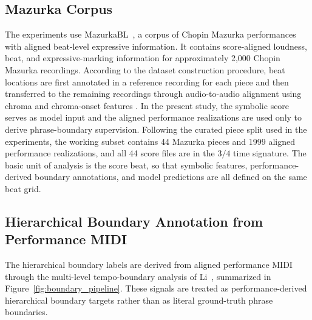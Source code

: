 \documentclass{article}
\begin{document}
\subsection{Mazurka Corpus}\label{subsec:mazurka_corpus}

The experiments use MazurkaBL~\cite{Kosta18MazurkaBL}, a corpus of Chopin Mazurka performances with aligned beat-level expressive information. It contains score-aligned loudness, beat, and expressive-marking information for approximately 2,000 Chopin Mazurka recordings. According to the dataset construction procedure, beat locations are first annotated in a reference recording for each piece and then transferred to the remaining recordings through audio-to-audio alignment using chroma and chroma-onset features \cite{Ewert2009ChromaOnsetSync}. In the present study, the symbolic score serves as model input and the aligned performance realizations are used only to derive phrase-boundary supervision. Following the curated piece split used in the experiments, the working subset contains 44 Mazurka pieces and 1999 aligned performance realizations, and all 44 score files are in the \(3/4\) time signature. The basic unit of analysis is the score beat, so that symbolic features, performance-derived boundary annotations, and model predictions are all defined on the same beat grid.

\subsection{Hierarchical Boundary Annotation from Performance MIDI}\label{subsec:boundary_annotation}

The hierarchical boundary labels are derived from aligned performance MIDI through the multi-level tempo-boundary analysis of Li~\cite{Li2016ExpressiveTimingThesis}, summarized in Figure~\ref{fig:boundary_pipeline}. These signals are treated as performance-derived hierarchical boundary targets rather than as literal ground-truth phrase boundaries.
\end{document}
